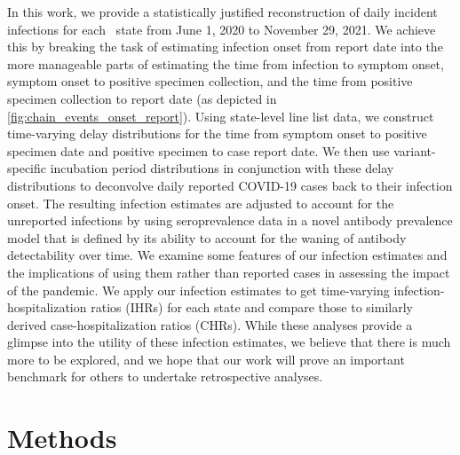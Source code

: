\documentclass{article}
\begin{document}
In this work, we provide a statistically justified reconstruction of
daily incident infections for each \US\ state from June 1, 2020 to November 29, 2021.
We achieve this by breaking the task of estimating infection onset
from report date into the more manageable parts of estimating the time from
infection to symptom onset, symptom onset to positive specimen collection,
and the time from positive specimen collection to report date (as
depicted in \autoref{fig:chain_events_onset_report}). Using state-level line list data, 
we construct time-varying delay distributions for the time from symptom onset to positive
specimen date and positive specimen to case report date. We then use 
variant-specific incubation period distributions in conjunction with these delay distributions to
deconvolve daily reported COVID-19 cases back to their infection onset.
The resulting infection estimates are adjusted to account for the unreported infections by
using seroprevalence data in a novel antibody prevalence model that is defined by its
ability to account for the waning of antibody detectability over time.  
We examine some features of our infection estimates and the implications of
using them rather than reported cases in assessing the impact of the pandemic.
We apply our infection estimates to get time-varying infection-hospitalization
ratios (IHRs) for each state and compare those to similarly derived
case-hospitalization ratios (CHRs).
While these analyses provide a glimpse into the utility of these
infection estimates, we believe that there is much more to be explored, and we hope that
our work will prove an important benchmark for others to undertake retrospective
analyses.

\section{Methods}
\end{document}

